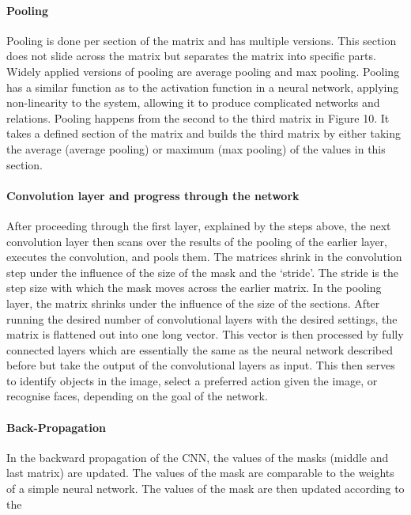 \paragraph{Pooling}
Pooling is done per section of the matrix and has multiple versions. This section does not slide across the matrix but separates the matrix into specific parts. Widely applied versions of pooling are average pooling and max pooling. Pooling has a similar function as to the activation function in a neural network, applying non-linearity to the system, allowing it to produce complicated networks and relations. Pooling happens from the second to the third matrix in Figure 10. It takes a defined section of the matrix and builds the third matrix by either taking the average (average pooling) or maximum (max pooling) of the values in this section. 

\paragraph{Convolution layer and progress through the network}
After proceeding through the first layer, explained by the steps above, the next convolution layer then scans over the results of the pooling of the earlier layer, executes the convolution, and pools them. The matrices shrink in the convolution step under the influence of the size of the mask and the \lq stride\rq . The stride is the step size with which the mask moves across the earlier matrix. In the pooling layer, the matrix shrinks under the influence of the size of the sections. 
After running the desired number of convolutional layers with the desired settings, the matrix is flattened out into one long vector. This vector is then processed by fully connected layers which are essentially the same as the neural network described before but take the output of the convolutional layers as input. This then serves to identify objects in the image, select a preferred action given the image, or recognise faces, depending on the goal of the network.

\paragraph{Back-Propagation}
In the backward propagation of the CNN, the values of the masks (middle and last matrix) are updated. The values of the mask are comparable to the weights of a simple neural network. The values of the mask are then updated according to the

